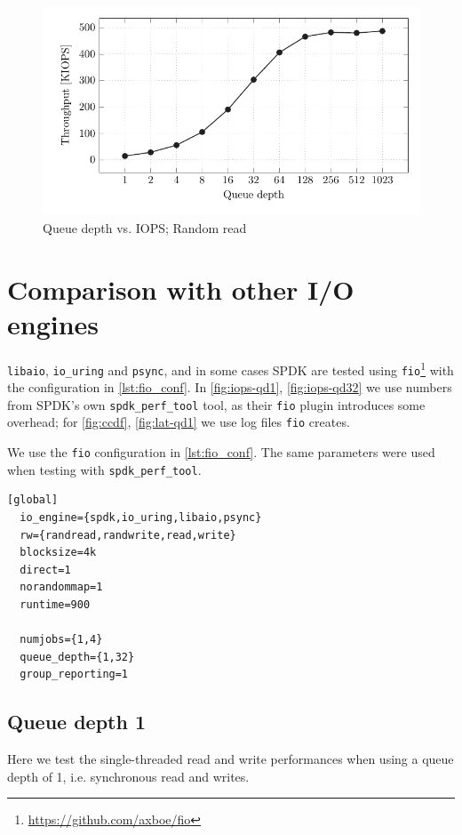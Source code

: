 \begin{figure}
  \centering
  \includegraphics[width=\textwidth]{figures/vroom-iops-qd}
  \caption{Queue depth vs. IOPS; Random read}
  \label{fig:vroom-iops-qd}
\end{figure}


\section{Comparison with other I/O engines}
\texttt{libaio}, \texttt{io\_uring} and \texttt{psync}, and in some cases SPDK are tested using \texttt{fio}\footnote{\url{https://github.com/axboe/fio}} with the configuration in \autoref{lst:fio_conf}. In \autoref{fig:iops-qd1}, \autoref{fig:iops-qd32} we use numbers from SPDK's own \texttt{spdk\_perf\_tool} tool, as their \texttt{fio} plugin introduces some overhead; for \autoref{fig:ccdf}, \autoref{fig:lat-qd1} we use log files \texttt{fio} creates.

We use the \texttt{fio} configuration in \autoref{lst:fio_conf}. The same parameters were used when testing with \texttt{spdk\_perf\_tool}.

\begin{lstlisting}[float, label=lst:fio_conf, caption=\texttt{fio} configuration]
  [global]
  io_engine={spdk,io_uring,libaio,psync}
  rw={randread,randwrite,read,write}
  blocksize=4k
  direct=1
  norandommap=1
  runtime=900

  numjobs={1,4}
  queue_depth={1,32}
  group_reporting=1
\end{lstlisting}

\subsection{Queue depth 1}
Here we test the single-threaded read and write performances when using a queue depth of 1, i.e. synchronous read and writes.

